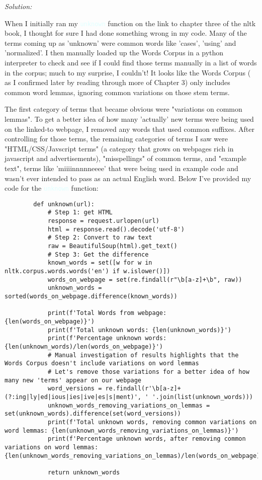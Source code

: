 \documentclass[11pt]{article}
\newenvironment{solution}{
	\vspace{10px}\noindent\emph{Solution:}
}{
	\vspace{10px}
}
\newcommand{\codeword}[1]{
	\texttt{\textcolor{lightCyan}{#1}}
}
\begin{document}
\begin{solution}
	
	When I initially ran my \codeword{unknown} function on the link to chapter three of the nltk book, I thought for sure I had done something wrong in my code. Many of the terms coming up as 'unknown' were common words like 'cases', 'using' and 'normalized'.  I then manually loaded up the Words Corpus in a python interpreter to check and see if I could find those terms manually in a list of words in the corpus; much to my surprise, I couldn't! It looks like the Words Corpus ( as I confirmed later by reading through more of Chapter 3) only includes common word lemmas, ignoring common variations on those stem terms. 
	
	The first category of terms that became obvious were "variations on common lemmas". To get a better idea of how many 'actually' new terms were being used on the linked-to webpage, I removed any words that used common suffixes. After controlling for those terms, the remaining categories of terms I saw were "HTML/CSS/Javscript terms" (a category that grows on webpages rich in javascript and advertisements), "misspellings" of common terms, and "example text", terms like 'miiiinnnnneeee' that were being used in example code and wasn't ever intended to pass as an actual English word. Below I've provided my code for the \codeword{unknown} function:
	
	\begin{lstlisting}
		def unknown(url): 
			# Step 1: get HTML
			response = request.urlopen(url)
			html = response.read().decode('utf-8')
			# Step 2: Convert to raw text
			raw = BeautifulSoup(html).get_text()
			# Step 3: Get the difference  
			known_words = set([w for w in nltk.corpus.words.words('en') if w.islower()])
			words_on_webpage = set(re.findall(r"\b[a-z]+\b", raw))
			unknown_words = sorted(words_on_webpage.difference(known_words))
			
			print(f'Total Words from webpage: {len(words_on_webpage)}')
			print(f'Total unknown words: {len(unknown_words)}')
			print(f'Percentage unknown words: {len(unknown_words)/len(words_on_webpage)}')
			# Manual investigation of results highlights that the Words Corpus doesn't include variations on word lemmas 
			# Let's remove those variations for a better idea of how many new 'terms' appear on our webpage 
			word_versions = re.findall(r'\b[a-z]+(?:ing|ly|ed|ious|ies|ive|es|s|ment)', ' '.join(list(unknown_words)))
			unknown_words_removing_variations_on_lemmas = set(unknown_words).difference(set(word_versions))
			print(f'Total unknown words, removing common variations on word lemmas: {len(unknown_words_removing_variations_on_lemmas)}')
			print(f'Percentage unknown words, after removing common variations on word lemmas: {len(unknown_words_removing_variations_on_lemmas)/len(words_on_webpage)}')
			
    		return unknown_words
		
	\end{lstlisting}

\end{solution} 
\end{document}
